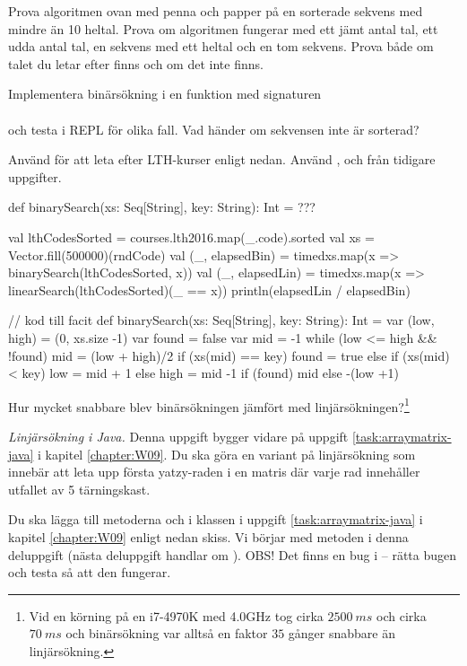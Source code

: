 \Subtask Prova algoritmen ovan med penna och papper på en sorterade sekvens med mindre än 10 heltal. Prova om algoritmen fungerar med ett jämt antal tal, ett udda antal tal, en sekvens med ett heltal och en tom sekvens. Prova både om talet du letar efter finns och om det inte finns.

\Subtask Implementera binärsökning i en funktion med signaturen\\
\\
och testa i REPL för olika fall. Vad händer om sekvensen inte är sorterad?

\Subtask Använd  för att leta efter LTH-kurser enligt nedan. Använd ,  och  från tidigare uppgifter.
\begin{Code}
def binarySearch(xs: Seq[String], key: String): Int = ??? 

val lthCodesSorted = courses.lth2016.map(_.code).sorted
val xs = Vector.fill(500000)(rndCode)
val (_, elapsedBin) = 
  timed{xs.map(x => binarySearch(lthCodesSorted, x))}
val (_, elapsedLin) = 
  timed{xs.map(x => linearSearch(lthCodesSorted)(_ == x))}
println(elapsedLin / elapsedBin)
\end{Code}

\begin{Code}
// kod till facit
def binarySearch(xs: Seq[String], key: String): Int = {
  var (low, high) = (0, xs.size -1)
  var found = false
  var mid = -1
  while (low <= high && !found) {
    mid = (low + high)/2
    if (xs(mid) == key) found = true 
    else if (xs(mid) < key) low = mid + 1
    else high = mid -1
  }
  if (found) mid else -(low +1)
} 
\end{Code}

\Subtask Hur mycket snabbare blev binärsökningen jämfört med linjärsökningen?\footnote{Vid en körning på en i7-4970K med 4.0GHz tog  cirka $2500~ms$ och  cirka $70~ms$ och binärsökning var alltså en faktor $35$ gånger snabbare än linjärsökning.}





\Task \emph{Linjärsökning i Java.} Denna uppgift bygger vidare på uppgift \ref{task:arraymatrix-java} i kapitel \ref{chapter:W09}. Du ska göra en variant på linjärsökning som innebär att leta upp första yatzy-raden i en matris där varje rad innehåller utfallet av 5 tärningskast. 

\Subtask Du ska lägga till metoderna  och  i klassen  i uppgift \ref{task:arraymatrix-java} i kapitel \ref{chapter:W09} enligt nedan skiss. Vi börjar med metoden   i denna deluppgift (nästa deluppgift handlar om ). OBS! Det finns en bug i  -- rätta bugen och testa så att den fungerar. 

